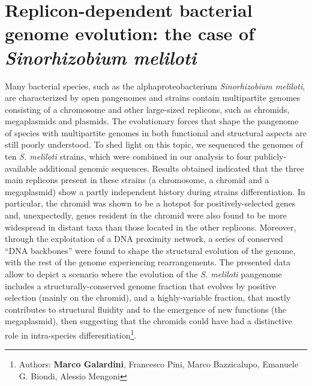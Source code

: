 \newpage


\newpage
\section{Replicon-dependent bacterial genome evolution: the case of \textit{Sinorhizobium meliloti}}
Many bacterial species, such as the alphaproteobacterium \textit{Sinorhizobium meliloti}, are characterized by open pangenomes and strains contain multipartite genomes consisting of a chromosome and other large-sized replicons, such as chromids, megaplasmids and plasmids.
The evolutionary forces that shape the pangenome of species with multipartite genomes in both functional and structural aspects are still poorly understood. To shed light on this topic, we sequenced the genomes of ten \textit{S. meliloti} strains, which were combined in our analysis to four publicly-available additional genomic sequences.
Results obtained indicated that the three main replicons present in these strains (a chromosome, a chromid and a megaplasmid) show a partly independent history during strains differentiation. In particular, the chromid was shown to be a hotspot for positively-selected genes and, unexpectedly, genes resident in the chromid were also found to be more widespread in distant taxa than those located in the other replicons. Moreover, through the exploitation of a DNA proximity network, a series of conserved “DNA backbones” were found to shape the structural evolution of the genome, with the rest of the genome experiencing rearrangements. 
The presented data allow to depict a scenario where the evolution of the \textit{S. meliloti} pangenome includes a structurally-conserved genome fraction that evolves by positive selection (mainly on the chromid), and a highly-variable fraction, that mostly contributes to structural fluidity and to the emergence of new functions (the megaplasmid), then suggesting that the chromids could have had a distinctive role in intra-species differentiation\footnote{Authors: \textbf{Marco Galardini}, Francesco Pini, Marco Bazzicalupo, Emanuele G. Biondi, Alessio Mengoni}.

